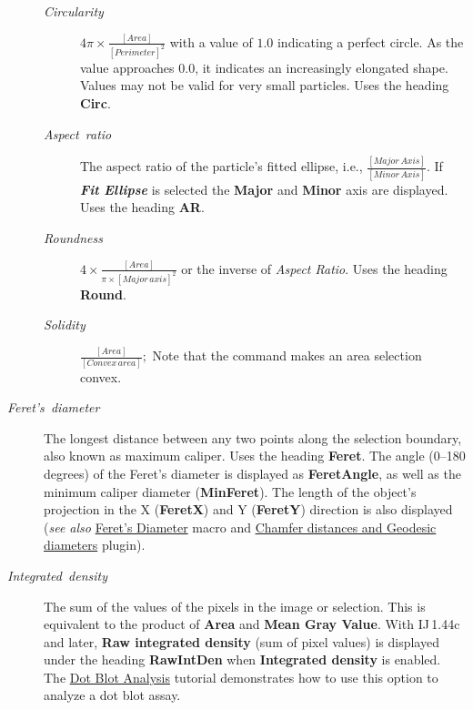 \begin{description}
\begin{description}
\item [{\emph{Circularity}}] \emph{$\ensuremath{4\pi\times\frac{[Area]}{[Perimeter]^{2}}}$}
with a value of $1.0$ indicating a perfect circle. As the value approaches
$0.0$, it indicates an increasingly elongated shape. Values may not
be valid for very small particles. Uses the heading\textbf{ Circ}.
\item [{\emph{Aspect\ ratio}}] The aspect ratio of the particle's fitted
ellipse, i.e., $\ensuremath{\frac{[Major\, Axis]}{[Minor\, Axis]}}$.
If \textbf{\emph{Fit Ellipse}} is selected the\textbf{ Major} and
\textbf{Minor} axis are displayed. Uses the heading\textbf{ AR}.
\item [{\emph{Roundness}}] $\ensuremath{4\times{}\frac{[Area]}{\pi\times[Major\, axis]^{2}}}$
or the inverse of \emph{Aspect Ratio}. Uses the heading \textbf{Round}.
\item [{\emph{Solidity}}] $\ensuremath{\frac{[Area]}{[Convex\, area]}};$
Note that the 
command makes an area selection convex.
\end{description}
\item [{\emph{Feret's\ diameter}}] The longest distance between any two
points along the selection boundary, also known as maximum
caliper. Uses the heading \textbf{Feret}. The angle (0--180 degrees)
of the Feret's diameter is displayed as \textbf{FeretAngle}, as well
as the minimum caliper diameter (\textbf{MinFeret}). The length of
the object's projection in the X (\textbf{FeretX}) and Y (\textbf{FeretY})
direction is also displayed (\emph{see also} \href{http://imagej.nih.gov/ij/macros/FeretsDiameter.txt}{Feret's Diameter}
macro and \href{http://imagejdocu.tudor.lu/doku.php?id=plugin:analysis:geodesic_distances:start}{Chamfer distances and Geodesic diameters}
plugin).
\item [{\emph{Integrated\ density}}] The sum of the values of the pixels
in the image or selection. This is equivalent to the product of \textbf{Area}
and \textbf{Mean Gray Value}. With IJ\,1.44c and later, \textbf{Raw
integrated density} (sum of pixel values) is displayed under the heading
\textbf{RawIntDen} when \textbf{Integrated density} is enabled. The
\href{http://imagej.nih.gov/ij/docs/examples/dot-blot/}{Dot Blot Analysis}
tutorial demonstrates how to use this option to analyze a dot blot
assay.

\end{description}
